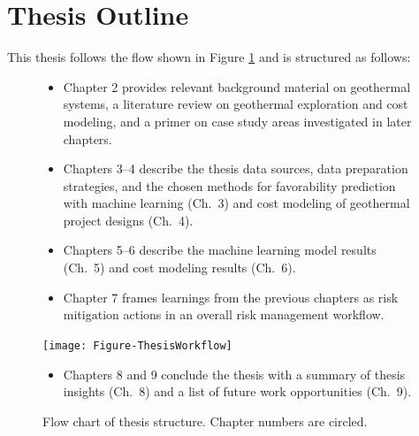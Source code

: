 \hfill\break
\section{Thesis Outline}\label{ch1:outline}
This thesis follows the flow shown in Figure \ref{fig:thesis_flow} and is structured as follows: 
\begin{figure}[!htp]
\onehalfspacing
\begin{minipage}[b]{0.5\textwidth}
\begin{itemize}
\item Chapter 2 provides relevant background material on geothermal systems, a literature review on geothermal exploration and cost modeling, and a primer on case study areas investigated in later chapters.
\item Chapters 3--4 describe the thesis data sources, data preparation strategies, and the chosen methods for favorability prediction with machine learning (Ch.\ 3) and cost modeling of geothermal project designs (Ch.\ 4).
\item Chapters 5--6 describe the machine learning model results (Ch.\ 5) and cost modeling results (Ch.\ 6).
\item Chapter 7 frames learnings from the previous chapters as risk mitigation actions in an overall risk management workflow.
\end{itemize}
\end{minipage} \hfill
\begin{minipage}[b]{0.47\textwidth}
\texttt{[image: Figure-ThesisWorkflow]}
\caption[Flow chart for thesis structure]{Flow chart of thesis structure. Chapter numbers are circled.}
\label{fig:thesis_flow}
\end{minipage}
\begin{itemize}
\item Chapters 8 and 9 conclude the thesis with a summary of thesis insights (Ch.\ 8) and a list of future work opportunities (Ch.\ 9).
\end{itemize}
\end{figure}